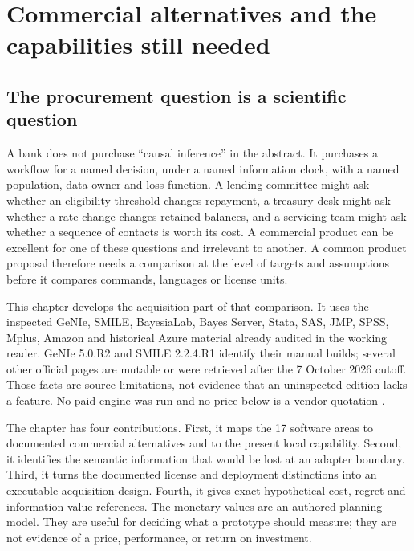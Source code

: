 \chapter{Commercial alternatives and the capabilities still needed}
\label{exec17:s8}

\section{The procurement question is a scientific question}
\label{exec17:s8-question}

A bank does not purchase ``causal inference'' in the abstract. It purchases a
workflow for a named decision, under a named information clock, with a named
population, data owner and loss function. A lending committee might ask whether
an eligibility threshold changes repayment, a treasury desk might ask whether a
rate change changes retained balances, and a servicing team might ask whether a
sequence of contacts is worth its cost. A commercial product can be excellent
for one of these questions and irrelevant to another. A common product proposal
therefore needs a comparison at the level of targets and assumptions before it
compares commands, languages or license units.

This chapter develops the acquisition part of that comparison. It uses the inspected GeNIe,
SMILE, BayesiaLab, Bayes Server, Stata, SAS, JMP, SPSS, Mplus, Amazon and
historical Azure material already audited in the working reader. GeNIe 5.0.R2
and SMILE 2.2.4.R1 identify their manual builds; several other official pages
are mutable or were retrieved after the 7 October 2026 cutoff. Those facts are
source limitations, not evidence that an uninspected edition lacks a feature.
No paid engine was run and no price below is a vendor quotation
\citep{exec13_genie_readme,exec13_smile_intro,exec13_bayesia_api,
exec13_ci_bayesserver_causality,exec13_ci_stata_causal_intro}.

The chapter has four contributions. First, it maps the 17 software areas to
documented commercial alternatives and to the present local capability. Second,
it identifies the semantic information that would be lost at an adapter
boundary. Third, it turns the documented license and deployment distinctions
into an executable acquisition design. Fourth, it gives exact hypothetical
cost, regret and information-value references. The monetary values are an
authored planning model. They are useful for deciding what a prototype should
measure; they are not evidence of a price, performance, or return on investment.

